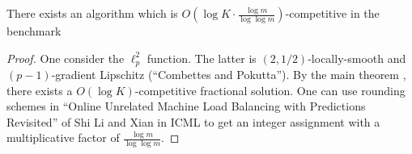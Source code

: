 \begin{theorem}
There exists an algorithm which is $O(\log K \cdot \frac{\log m}{ \log \log m})$-competitive in the benchmark
\end{theorem}
%
\begin{proof}
One consider the $\ell_{p}^{2}$ function. The latter is $(2,1/2)$-locally-smooth and $(p-1)$-gradient Lipschitz (``Combettes and Pokutta'').
By the main theorem ,
there exists a $O(\log K)$-competitive fractional solution.
One can use rounding schemes in ``Online Unrelated Machine Load Balancing with Predictions Revisited'' of Shi Li and Xian in ICML to get an integer assignment with a multiplicative factor of $\frac{\log m}{ \log \log m}$.
\end{proof}
